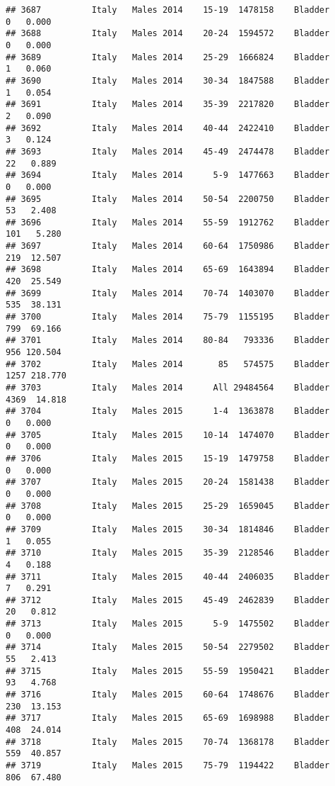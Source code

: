 \documentclass[
]{article}
\begin{document}
\begin{verbatim}
## 3687          Italy   Males 2014    15-19  1478158    Bladder      0   0.000
## 3688          Italy   Males 2014    20-24  1594572    Bladder      0   0.000
## 3689          Italy   Males 2014    25-29  1666824    Bladder      1   0.060
## 3690          Italy   Males 2014    30-34  1847588    Bladder      1   0.054
## 3691          Italy   Males 2014    35-39  2217820    Bladder      2   0.090
## 3692          Italy   Males 2014    40-44  2422410    Bladder      3   0.124
## 3693          Italy   Males 2014    45-49  2474478    Bladder     22   0.889
## 3694          Italy   Males 2014      5-9  1477663    Bladder      0   0.000
## 3695          Italy   Males 2014    50-54  2200750    Bladder     53   2.408
## 3696          Italy   Males 2014    55-59  1912762    Bladder    101   5.280
## 3697          Italy   Males 2014    60-64  1750986    Bladder    219  12.507
## 3698          Italy   Males 2014    65-69  1643894    Bladder    420  25.549
## 3699          Italy   Males 2014    70-74  1403070    Bladder    535  38.131
## 3700          Italy   Males 2014    75-79  1155195    Bladder    799  69.166
## 3701          Italy   Males 2014    80-84   793336    Bladder    956 120.504
## 3702          Italy   Males 2014       85   574575    Bladder   1257 218.770
## 3703          Italy   Males 2014      All 29484564    Bladder   4369  14.818
## 3704          Italy   Males 2015      1-4  1363878    Bladder      0   0.000
## 3705          Italy   Males 2015    10-14  1474070    Bladder      0   0.000
## 3706          Italy   Males 2015    15-19  1479758    Bladder      0   0.000
## 3707          Italy   Males 2015    20-24  1581438    Bladder      0   0.000
## 3708          Italy   Males 2015    25-29  1659045    Bladder      0   0.000
## 3709          Italy   Males 2015    30-34  1814846    Bladder      1   0.055
## 3710          Italy   Males 2015    35-39  2128546    Bladder      4   0.188
## 3711          Italy   Males 2015    40-44  2406035    Bladder      7   0.291
## 3712          Italy   Males 2015    45-49  2462839    Bladder     20   0.812
## 3713          Italy   Males 2015      5-9  1475502    Bladder      0   0.000
## 3714          Italy   Males 2015    50-54  2279502    Bladder     55   2.413
## 3715          Italy   Males 2015    55-59  1950421    Bladder     93   4.768
## 3716          Italy   Males 2015    60-64  1748676    Bladder    230  13.153
## 3717          Italy   Males 2015    65-69  1698988    Bladder    408  24.014
## 3718          Italy   Males 2015    70-74  1368178    Bladder    559  40.857
## 3719          Italy   Males 2015    75-79  1194422    Bladder    806  67.480

\end{verbatim}
\end{document}
